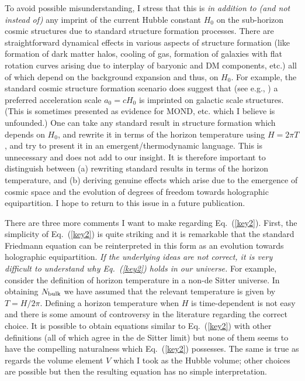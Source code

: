 \documentclass[aps,prd,showpacs,nofootinbib,floats,floatfix,preprintnumbers,groupedaddress,twocolumn]{revtex4}
\def\eq#1{{Eq.~(\ref{#1})}}
\begin{document}
To avoid possible misunderstanding, I stress that this is \textit{in addition to (and not instead of)} any imprint of the current Hubble constant $H_0$ on the sub-horizon  cosmic structures  due to standard structure formation processes. 
There are straightforward dynamical effects in various aspects of structure formation (like formation of dark matter halos, cooling of gas, formation of galaxies with flat rotation curves arising due to interplay of baryonic and DM components, etc.) all of which  depend on the background expansion and thus, on $H_0$.  For example, the standard cosmic structure formation scenario does suggest that  (see e.g., \cite{turnerdlb})  a preferred acceleration scale $a_0 =  c H_0$ is imprinted on galactic scale structures. (This is sometimes presented as evidence for MOND, etc. which I believe is unfounded.) 
One can take any standard result in structure formation which depends on $H_0$, and rewrite it in terms of the horizon temperature using $H=2\pi T$, and try to present it in an emergent/thermodynamic language. This is unnecessary and does not add to our insight. It is therefore important to distinguish between (a) rewriting  standard results in terms of the horizon temperature, and (b) deriving genuine effects which arise due to the emergence of cosmic space and the evolution of degrees of freedom towards holographic equipartition. I hope to return to this issue in a future publication.

There are three more comments I want to make regarding \eq{key2}.
First, the simplicity of \eq{key2} is quite striking and it is remarkable that the standard Friedmann equation can be reinterpreted in this form as an evolution towards holographic equipartition. \textit{If the underlying ideas are not correct, it is very difficult to understand why \eq{key2} holds in our universe. }
For example, consider the definition of horizon temperature in a non-de Sitter universe. In obtaining $N_{\rm bulk}$  we have assumed that the relevant temperature is given by $T= H/2\pi$. Defining a horizon temperature when $H$ is time-dependent  is not easy and there is some amount of controversy in the literature regarding the correct choice. It is possible to obtain equations similar to \eq{key2} with other definitions (all of which agree in the de Sitter limit) but none of them seems to have the compelling naturalness which \eq{key2} possesses. The same is true as regards the volume element $V$ which I took as the Hubble volume; other choices are possible but then the resulting equation has no simple interpretation.
\end{document}
